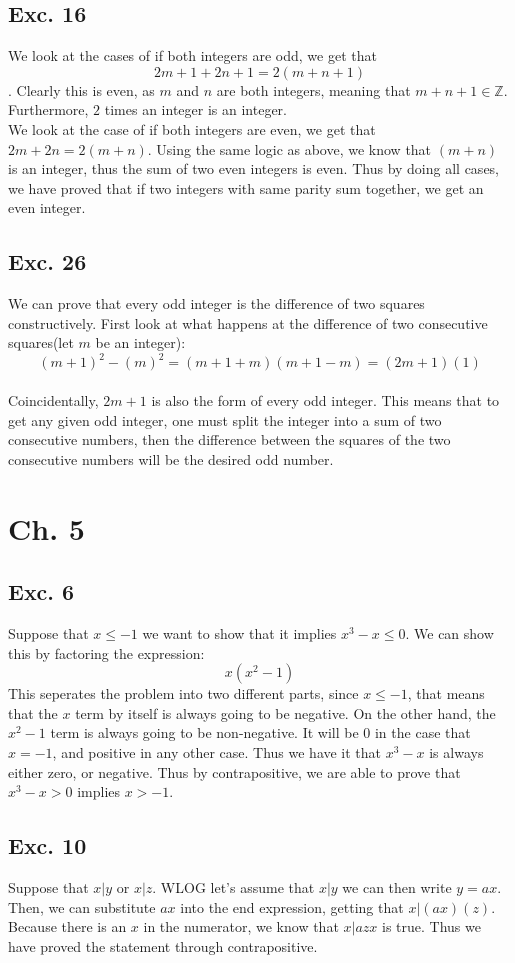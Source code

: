 \documentclass[12pt]{article}
\begin{document}
\subsection*{Exc. 16}
We look at the cases of if both integers are odd, we get that $$2m+1 + 2n+1 = 2(m+n+1)$$. 
Clearly this is even, as $m$ and $n$ are both integers, meaning that $m+n+1 \in \mathbb{Z}$.
Furthermore, $2$ times an integer is an integer. \\
We look at the case of if both integers are even, we get that $2m + 2n = 2(m+n)$. Using the same logic as above,
we know that $(m+n)$ is an integer, thus the sum of two even integers is even. Thus by doing all cases,
we have proved that if two integers with same parity sum together, we get an even integer.

\subsection*{Exc. 26}
We can prove that every odd integer is the difference of two squares constructively. First look at what happens
at the difference of two consecutive squares(let $m$ be an integer): 
$$(m+1)^2 - (m)^2 = (m+1 + m)(m+1-m) = (2m+1)(1)$$\\
Coincidentally, $2m+1$ is also the form of every odd integer. This means that to get any given odd integer,
one must split the integer into a sum of two consecutive numbers, then the difference between the squares of the two consecutive numbers
will be the desired odd number. 

\section*{Ch. 5}

\subsection*{Exc. 6}
Suppose that $x \le -1$ we want to show that it implies $x^3 - x \le 0$. We can show this by
factoring the expression: 
$$x(x^2-1)$$
This seperates the problem into two different parts, since $x \le -1$, that means that the $x$ term
by itself is always going to be negative. On the other hand, the $x^2 - 1$ term is always going to be non-negative.
It will be 0 in the case that $x = -1$, and positive in any other case. Thus we have it that $x^3 - x$ is always either zero,
or negative. Thus by contrapositive, we are able to prove that $x^3 - x > 0$ implies 
$x > -1$.

\subsection*{Exc. 10}
Suppose that $x|y$ or $x|z$. WLOG let's assume that $x|y$ we can then write $y = ax$. Then,
we can substitute $ax$ into the end expression, getting that $x|(ax)(z)$. Because there is an $x$ in the 
numerator, we know that $x|azx$ is true. Thus we have proved the statement through contrapositive.
\end{document}
